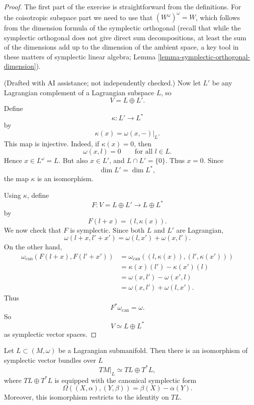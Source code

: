 \begin{proof}
The first part of the exercise
is straightforward from the definitions.
For the coisotropic subspace part
we need to use that $(W^\omega)^\omega=W$,
which follows from the dimension formula
of the symplectic orthogonal
(recall that while the symplectic
orthogonal does not give
direct sum decompositions,
at least the sum of the dimensions
add up to the dimension of the ambient space,
a key tool in these matters of symplectic
linear algebra; 
Lemma
\ref{lemma-symplectic-orthogonal-dimension}).

\medskip\noindent
(Drafted with AI assistance; not independently checked.)
Now let $L'$ be any Lagrangian complement
of a Lagrangian subspace $L$, so
$$
V=L\oplus L'.
$$
Define
$$
\kappa:L'\longrightarrow L^*
$$
by
$$
\kappa(x)=\omega(x,-)|_L.
$$
This map is injective. Indeed, if
$\kappa(x)=0$, then
$$
\omega(x,l)=0
\qquad
\text{for all }l\in L.
$$
Hence $x\in L^\omega=L$. But also
$x\in L'$, and $L\cap L'=\{0\}$. Thus
$x=0$. Since
$$
\dim L'=\dim L^*,
$$
the map $\kappa$ is an isomorphism.

\medskip\noindent
Using $\kappa$, define
$$
F:V=L\oplus L'\longrightarrow L\oplus L^*
$$
by
$$
F(l+x)=(l,\kappa(x)).
$$
We now check that $F$ is symplectic. Since
both $L$ and $L'$ are Lagrangian,
$$
\omega(l+x,l'+x')
=
\omega(l,x')+\omega(x,l').
$$
On the other hand,
\begin{align*}
\omega_{\operatorname{can}}
(F(l+x),F(l'+x'))
&=
\omega_{\operatorname{can}}
((l,\kappa(x)),(l',\kappa(x')))\\
&=
\kappa(x)(l')-\kappa(x')(l)\\
&=
\omega(x,l')-\omega(x',l)\\
&=
\omega(x,l')+\omega(l,x').
\end{align*}
Thus
$$
F^*\omega_{\operatorname{can}}=\omega.
$$
So
$$
V\simeq L\oplus L^*
$$
as symplectic vector spaces.
\end{proof}


\begin{lemma}
\label{lemma-lagrangian-complements-fiber}
Let $L\subset (M,\omega)$ be a
Lagrangian submanifold. Then there is an
isomorphism of symplectic vector bundles
over $L$
$$
TM|_L\simeq TL\oplus T^*L,
$$
where $TL\oplus T^*L$ is equipped with the
canonical symplectic form
$$
\Omega((X,\alpha),(Y,\beta))
=
\beta(X)-\alpha(Y).
$$
Moreover, this isomorphism restricts to
the identity on $TL$.
\end{lemma}

